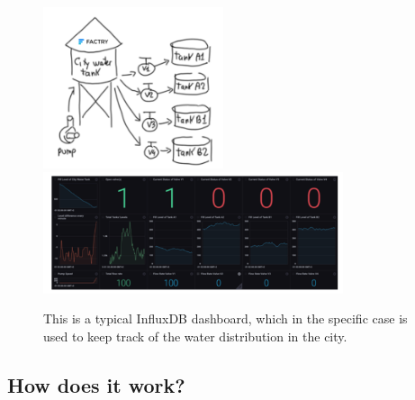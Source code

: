 \documentclass[10pt,a4paper]{article}
\begin{document}
   \begin{figure}[ht!]
 \hfill \includegraphics[width=150pt]{images/influxdb-demo1}
 \hspace*{\fill}
 \vspace{0.3em}
 \center
  \hfill \includegraphics[width=250pt]{images/influxdb-demo2}
 \hspace*{\fill}
 \caption{This is a typical InfluxDB dashboard, which in the specific case is used to keep track of the water distribution in the city.}
 \end{figure} 
\subsection{How does it work?}
\end{document}
